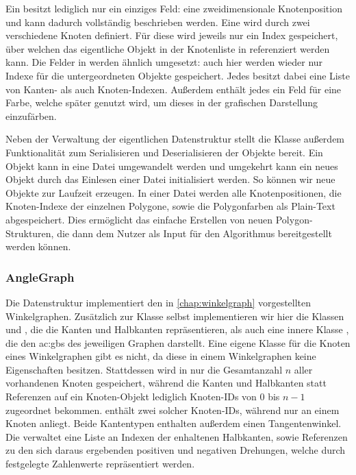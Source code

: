 Ein  besitzt lediglich nur ein einziges Feld: eine zweidimensionale Knotenposition und kann dadurch vollständig
beschrieben werden. Eine  wird durch zwei verschiedene Knoten definiert. Für diese wird jeweils nur ein Index gespeichert,
über welchen das eigentliche  Objekt in der Knotenliste in  referenziert werden kann. Die Felder in
 werden ähnlich umgesetzt: auch hier werden wieder nur Indexe für die untergeordneten Objekte gespeichert. Jedes
 besitzt dabei eine Liste von Kanten- als auch Knoten-Indexen. Außerdem enthält jedes  ein Feld
für eine Farbe, welche später genutzt wird, um dieses in der grafischen Darstellung einzufärben.

Neben der Verwaltung der eigentlichen Datenstruktur stellt die  Klasse außerdem Funktionalität zum Serialisieren
und Deserialisieren der Objekte bereit. Ein  Objekt kann in eine  Datei umgewandelt werden und umgekehrt
kann ein neues  Objekt durch das Einlesen einer  Datei initialisiert werden. So können wir neue
 Objekte zur Laufzeit erzeugen. In einer  Datei werden alle Knotenpositionen, die Knoten-Indexe der einzelnen
Polygone, sowie die Polygonfarben als Plain-Text abgespeichert. Dies ermöglicht das einfache Erstellen von neuen Polygon-Strukturen, die
dann dem Nutzer als Input für den Algorithmus bereitgestellt werden können.

\subsubsection{AngleGraph}
Die  Datenstruktur implementiert den in \autoref{chap:winkelgraph} vorgestellten Winkelgraphen. Zusätzlich zur
 Klasse selbst implementieren wir hier die Klassen  und , die die Kanten
und Halbkanten repräsentieren, als auch eine innere Klasse , die den \gls{ac:gbs} des jeweiligen Graphen
darstellt. Eine eigene Klasse für die Knoten eines Winkelgraphen gibt es nicht, da diese in einem Winkelgraphen keine Eigenschaften
besitzen. Stattdessen wird in  nur die Gesamtanzahl \(n\) aller vorhandenen Knoten gespeichert, während die Kanten
und Halbkanten statt Referenzen auf ein Knoten-Objekt lediglich Knoten-IDs von \(0\) bis \(n - 1\) zugeordnet bekommen.
 enthält zwei solcher Knoten-IDs, während  nur an einem Knoten anliegt. Beide Kantentypen
enthalten außerdem einen Tangentenwinkel. Die  verwaltet eine Liste an Indexen der enhaltenen Halbkanten, sowie
Referenzen zu den sich daraus ergebenden positiven und negativen Drehungen, welche durch festgelegte Zahlenwerte repräsentiert werden.

